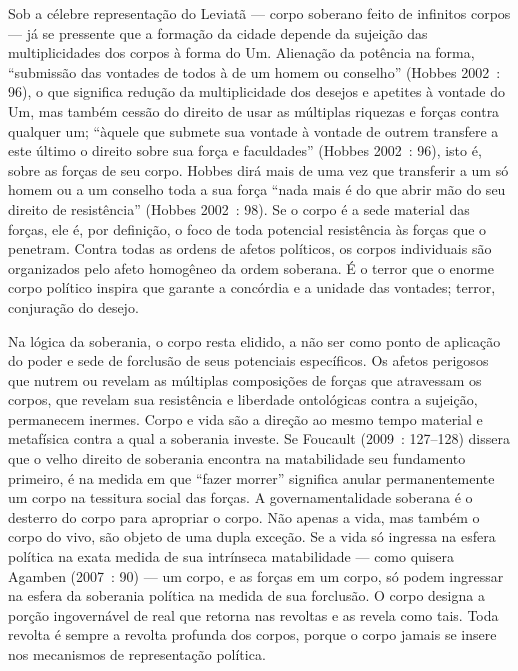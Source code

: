 Sob a célebre representação do Leviatã --- corpo soberano feito de
infinitos corpos --- já se pressente que a formação da cidade depende da
sujeição das multiplicidades dos corpos à forma do Um. Alienação da
potência na forma, ``submissão das vontades de todos à de um homem ou
conselho'' (Hobbes 2002~: 96), o que significa redução da multiplicidade
dos desejos e apetites à vontade do Um, mas também cessão do direito de
usar as múltiplas riquezas e forças contra qualquer um; ``àquele que
submete sua vontade à vontade de outrem transfere a este último o
direito sobre sua força e faculdades'' (Hobbes 2002~: 96), isto é, sobre
as forças de seu corpo. Hobbes dirá mais de uma vez que transferir a um
só homem ou a um conselho toda a sua força ``nada mais é do que abrir
mão do seu direito de resistência'' (Hobbes 2002~: 98). Se o corpo é a
sede material das forças, ele é, por definição, o foco de toda potencial
resistência às forças que o penetram. Contra todas as ordens de afetos
políticos, os corpos individuais são organizados pelo afeto homogêneo da
ordem soberana. É o terror que o enorme corpo político inspira que
garante a concórdia e a unidade das vontades; terror, conjuração do
desejo.

Na lógica da soberania, o corpo resta elidido, a não ser como ponto de
aplicação do poder e sede de forclusão de seus potenciais específicos.
Os afetos perigosos que nutrem ou revelam as múltiplas composições de
forças que atravessam os corpos, que revelam sua resistência e liberdade
ontológicas contra a sujeição, permanecem inermes. Corpo e vida são a
direção ao mesmo tempo material e metafísica contra a qual a soberania
investe. Se Foucault (2009~: 127--128) dissera que o velho direito de
soberania encontra na matabilidade seu fundamento primeiro, é na medida
em que ``fazer morrer'' significa anular permanentemente um corpo na
tessitura social das forças. A governamentalidade soberana é o desterro
do corpo para apropriar o corpo. Não apenas a vida, mas também o corpo
do vivo, são objeto de uma dupla exceção. Se a vida só ingressa na
esfera política na exata medida de sua intrínseca matabilidade --- como
quisera Agamben (2007~: 90) --- um corpo, e as forças em um corpo, só
podem ingressar na esfera da soberania política na medida de sua
forclusão. O corpo designa a porção ingovernável de real que retorna nas
revoltas e as revela como tais. Toda revolta é sempre a revolta profunda
dos corpos, porque o corpo jamais se insere nos mecanismos de
representação política.

